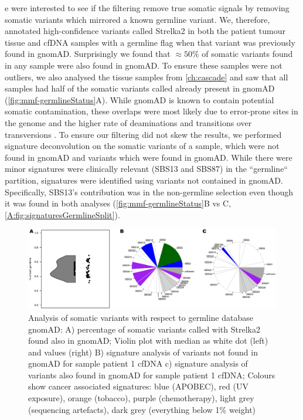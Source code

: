 e were  interested to see if the filtering remove true somatic signals by removing somatic variants which mirrored a known germline variant. We, therefore, annotated high-confidence variants called  Strelka2 in both the patient tumour tissue and cfDNA samples with a germline flag when that variant was previously found in gnomAD. Surprisingly we found that $\approx 50\%$ of somatic variants found in any sample were also found in gnomAD. To ensure these samples were not outliers, we also analysed the tissue samples from \autoref{ch:cascade} and saw that all samples had half of the somatic variants called already present in gnomAD (\autoref{fig:mmf-germlineStatus}A). While gnomAD is known to contain potential somatic contamination, these overlaps were most likely due to error-prone sites in the genome and the higher rate of deaminations and transitions over transversions \cite{Meyerson2020}. To ensure our filtering did not skew the results, we performed signature deconvolution on the somatic variants of a sample, which were not found in gnomAD and variants which were found in gnomAD. While there were minor signatures  were clinically relevant (SBS13 and SBS87) in the ``germline`` partition,  signatures were identified using variants not contained in gnomAD. Specifically, SBS13's contribution was  in the non-germline selection even though it was found in both analyses (\autoref{fig:mmf-germlineStatus}B vs C, \autoref{A:fig:signaturesGermlineSplit}).

\begin{figure}[ht]
\centering
\includegraphics[width=.99\linewidth]{Figures/MisMatchFinder/somaticVarsInGermlineSites.pdf}
\caption[Somatic variants found in germline sites]{Analysis of somatic variants with respect to germline database gnomAD: A) percentage of somatic variants called with Strelka2 found also in gnomAD; Violin plot with median as white dot (left) and values (right)  B) signature analysis of variants not found in gnomAD for sample patient 1 cfDNA c) signature analysis of variants also found in gnomAD for sample patient 1 cfDNA; Colours show cancer associated signatures: blue (APOBEC), red (UV exposure), orange (tobacco), purple (chemotherapy), light grey (sequencing artefacts), dark grey (everything below 1\% weight)}\label{fig:mmf-germlineStatus}
\end{figure}
  


